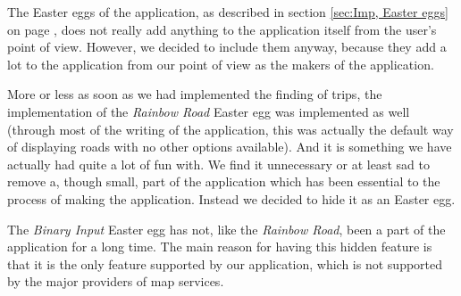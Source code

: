 The Easter eggs of the application, as described in section \ref{sec:Imp, Easter eggs} on page \pageref{sec:Imp, Easter eggs}, does not really add anything to the application itself from the user's point of view. However, we decided to include them anyway, because they add a lot to the application from our point of view as the makers of the application.

More or less as soon as we had implemented the finding of trips, the implementation of the \textit{Rainbow Road} Easter egg was implemented as well (through most of the writing of the application, this was actually the default way of displaying roads with no other options available). And it is something we have actually had quite a lot of fun with. We find it unnecessary or at least sad to remove a, though small, part of the application which has been essential to the process of making the application. Instead we decided to hide it as an Easter egg.

The \textit{Binary Input} Easter egg has not, like the \textit{Rainbow Road}, been a part of the application for a long time. The main reason for having this hidden feature is that it is the only feature supported by our application, which is not supported by the major providers of map services.